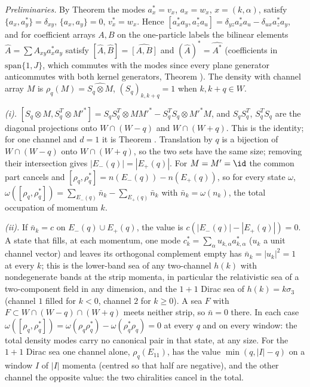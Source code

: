 \emph{Preliminaries.} By Theorem  the modes $a_{x}^{*} = v_{x}$, $a_{x} = w_{x}$, $x = (k, \alpha)$, satisfy $\{a_{x}, a_{y}^{*}\} = \delta_{xy}$, $\{a_{x}, a_{y}\} = 0$, $v_{x}^{*} = w_{x}$. Hence $[a_{x}^{*}a_{y}, a_{z}^{*}a_{u}] = \delta_{yz}a_{x}^{*}a_{u} - \delta_{ux}a_{z}^{*}a_{y}$, and for coefficient arrays $A, B$ on the one-particle labels the bilinear elements $\hat A = \sum A_{xy}a_{x}^{*}a_{y}$ satisfy $[\hat A, \hat B] = \widehat{[A, B]}$ and $(\hat A)^{*} = \widehat{A^{*}}$ (coefficients in $\mathrm{span}\{1, J\}$, which commutes with the modes since every plane generator anticommutes with both kernel generators, Theorem ). The density with channel array $M$ is $\rho_{q}(M) = \widehat{S_{q}\otimes M}$, $(S_{q})_{k,k+q} = 1$ when $k, k + q \in W$.

\emph{(i).} $[S_{q}\otimes M, S_{q}^{T}\otimes M'^{*}] = S_{q}S_{q}^{T}\otimes MM'^{*} - S_{q}^{T}S_{q}\otimes M'^{*}M$, and $S_{q}S_{q}^{T}$, $S_{q}^{T}S_{q}$ are the diagonal projections onto $W \cap (W - q)$ and $W \cap (W + q)$. This is the identity; for one channel and $d = 1$ it is Theorem . Translation by $q$ is a bijection of $W \cap (W - q)$ onto $W \cap (W + q)$, so the two sets have the same size; removing their intersection gives $|E_{-}(q)| = |E_{+}(q)|$. For $M = M' = \id$ the common part cancels and $[\rho_{q}, \rho_{q}^{*}] = n(E_{-}(q)) - n(E_{+}(q))$, so for every state $\omega$, $\omega([\rho_{q}, \rho_{q}^{*}]) = \sum_{E_{-}(q)}\bar n_{k} - \sum_{E_{+}(q)}\bar n_{k}$ with $\bar n_{k} = \omega(n_{k})$, the total occupation of momentum $k$.

\emph{(ii).} If $\bar n_{k} = c$ on $E_{-}(q) \cup E_{+}(q)$, the value is $c(|E_{-}(q)| - |E_{+}(q)|) = 0$. A state that fills, at each momentum, one mode $c_{k}^{*} = \sum_{\alpha}u_{k,\alpha}a_{k,\alpha}^{*}$ ($u_{k}$ a unit channel vector) and leaves its orthogonal complement empty has $\bar n_{k} = |u_{k}|^{2} = 1$ at every $k$; this is the lower-band sea of any two-channel $h(k)$ with nondegenerate bands at the strip momenta, in particular the relativistic sea of a two-component field in any dimension, and the $1 + 1$ Dirac sea of $h(k) = k\sigma_{3}$ (channel $1$ filled for $k < 0$, channel $2$ for $k \ge 0$). A sea $F$ with $F \subset W \cap (W - q) \cap (W + q)$ meets neither strip, so $\bar n = 0$ there. In each case $\omega([\rho_{q}, \rho_{q}^{*}]) = \omega(\rho_{q}\rho_{q}^{*}) - \omega(\rho_{q}^{*}\rho_{q}) = 0$ at every $q$ and on every window: the total density modes carry no canonical pair in that state, at any size. For the $1 + 1$ Dirac sea one channel alone, $\rho_{q}(E_{11})$, has the value $\min(q, |I| - q)$ on a window $I$ of $|I|$ momenta (centred so that half are negative), and the other channel the opposite value: the two chiralities cancel in the total.

